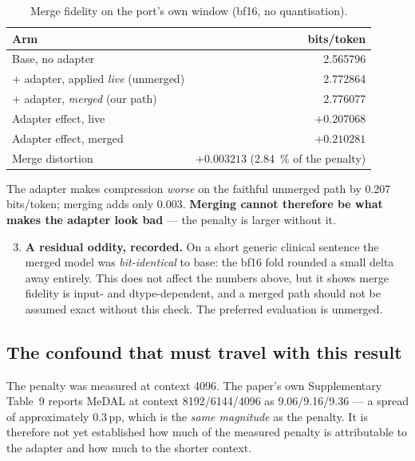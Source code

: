 \documentclass[11pt,a4paper]{article}
\begin{document}
\begin{table}[htbp]
\centering
\small
\caption{Merge fidelity on the port's own window (bf16, no quantisation).}
\label{tab:merge}
\begin{tabular}{lr}
\toprule
Arm & bits/token \\
\midrule
Base, no adapter & 2.565796 \\
+ adapter, applied \emph{live} (unmerged) & 2.772864 \\
+ adapter, \emph{merged} (our path) & 2.776077 \\
\midrule
Adapter effect, live & $+0.207068$ \\
Adapter effect, merged & $+0.210281$ \\
Merge distortion & $+0.003213$ (\SI{2.84}{\%} of the penalty) \\
\bottomrule
\end{tabular}
\end{table}

The adapter makes compression \emph{worse} on the faithful unmerged path by
\num{0.207} bits/token; merging adds only \num{0.003}. \textbf{Merging cannot
therefore be what makes the adapter look bad} --- the penalty is larger without
it.

\begin{enumerate}[leftmargin=1.4em,itemsep=2pt]
\setcounter{enumi}{2}
\item \textbf{A residual oddity, recorded.} On a short generic clinical sentence
      the merged model was \emph{bit-identical} to base: the bf16 fold rounded a
      small delta away entirely. This does not affect the numbers above, but it
      shows merge fidelity is input- and dtype-dependent, and a merged path should
      not be assumed exact without this check. The preferred evaluation is
      unmerged.
\end{enumerate}

\subsection{The confound that must travel with this result}

The penalty was measured at context \num{4096}. The paper's own Supplementary
Table~9 reports MeDAL at context 8192/6144/4096 as \num{9.06}/\num{9.16}/\num{9.36}
--- a spread of approximately \num{0.3}\,pp, which is the \emph{same magnitude} as
the penalty. It is therefore not yet established how much of the measured penalty
is attributable to the adapter and how much to the shorter context.
\end{document}

